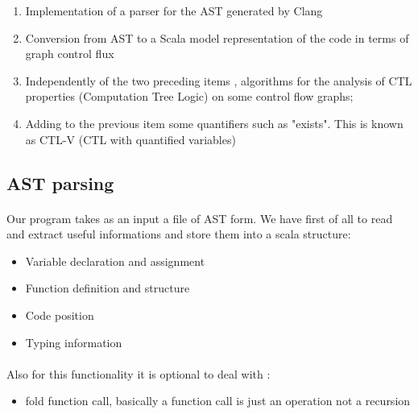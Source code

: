 \documentclass{report}
\begin{document}
\begin{enumerate}
        \item Implementation of a parser for the AST generated by Clang
        \item Conversion from AST to a Scala model representation of the code in terms of graph control flux
        \item Independently of the two preceding items , algorithms for the analysis of CTL properties (Computation Tree Logic) on some control flow graphs;
        \item Adding to the previous item some quantifiers such as "exists". This is known as CTL-V (CTL with quantified variables)
    \end{enumerate}
\subsection{AST parsing}

\paragraph{}
\hspace{4mm}\textnormal{Our program takes as an input a file of AST form. We have first of all to read and extract useful informations and store them into a scala structure:}

\vspace{4mm}
\begin{itemize}
\item Variable declaration and assignment\vspace{1mm}
\item Function definition and structure\vspace{1mm}
\item Code position\vspace{1mm}
\item Typing information\vspace{1mm}
\end{itemize}

\paragraph{}
\hspace{4mm}\textnormal{Also for this functionality it is optional to deal with  :}

\vspace{4mm}
\begin{itemize}
\item fold function call, basically a function call is just an operation not a recursion\vspace{1mm}
\end{itemize}
\end{document}
